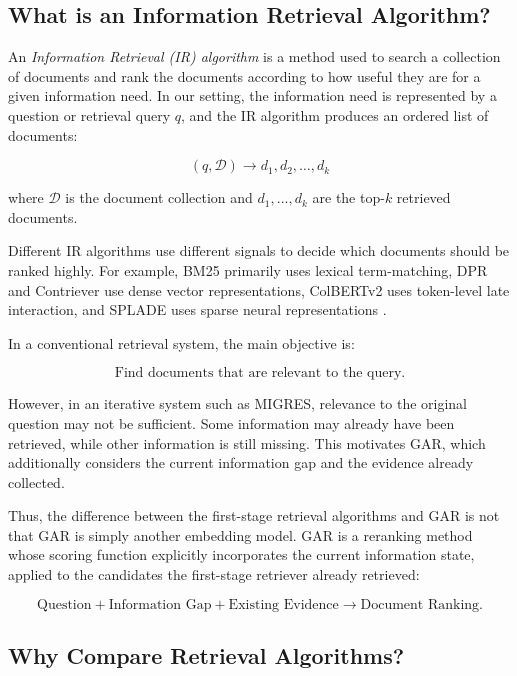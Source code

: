 \documentclass[11pt,a4paper]{article}
\begin{document}
\subsection{What is an Information Retrieval Algorithm?}

An \textit{Information Retrieval (IR) algorithm} is a method used to
search a collection of documents and rank the documents according to how
useful they are for a given information need. In our setting, the
information need is represented by a question or retrieval query $q$, and
the IR algorithm produces an ordered list of documents:

\[
\boxed{
(q,\mathcal{D})
\rightarrow
d_1,d_2,\ldots,d_k
}
\]

where $\mathcal{D}$ is the document collection and $d_1,\ldots,d_k$ are the top-$k$
retrieved documents.

Different IR algorithms use different signals to decide which documents
should be ranked highly. For example, BM25 primarily uses lexical
term-matching, DPR and Contriever use dense vector representations,
ColBERTv2 uses token-level late interaction, and SPLADE uses sparse neural
representations \citep{robertson-zaragoza-2009,karpukhin-etal-2020-dense,
izacard-grave-2021-contriever,santhanam-etal-2022-colbertv2,
formal-etal-2021-splade}.

In a conventional retrieval system, the main objective is:

\[
\boxed{
\text{Find documents that are relevant to the query.}
}
\]

However, in an iterative system such as MIGRES, relevance to the original
question may not be sufficient. Some information may already have been
retrieved, while other information is still missing. This motivates GAR,
which additionally considers the current information gap and the evidence
already collected.

Thus, the difference between the first-stage retrieval algorithms and GAR is
not that GAR is simply another embedding model. GAR is a reranking
method whose scoring function explicitly incorporates the
current information state, applied to the candidates the first-stage retriever already retrieved:

\[
\boxed{
\text{Question}
+
\text{Information Gap}
+
\text{Existing Evidence}
\rightarrow
\text{Document Ranking}.
}
\]

\subsection{Why Compare Retrieval Algorithms?}
\end{document}
